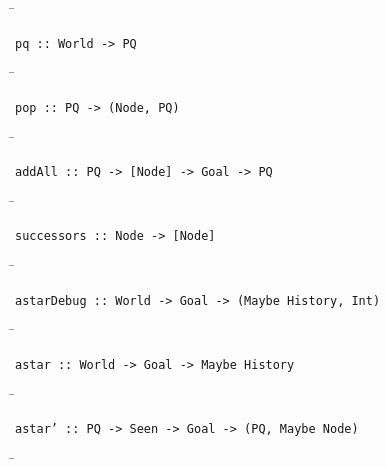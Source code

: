 \begin{tabbing}
\hspace*{1cm}\= \kill
\> 
\end{tabbing}
\begin{verbatim}
pq :: World -> PQ
\end{verbatim}
\begin{tabbing}
\hspace*{1cm}\= \kill
\> 
\end{tabbing}
\begin{verbatim}
pop :: PQ -> (Node, PQ)
\end{verbatim}
\begin{tabbing}
\hspace*{1cm}\= \kill
\> 
\end{tabbing}
\begin{verbatim}
addAll :: PQ -> [Node] -> Goal -> PQ
\end{verbatim}
\begin{tabbing}
\hspace*{1cm}\= \kill
\> 
\end{tabbing}
\begin{verbatim}
successors :: Node -> [Node]
\end{verbatim}
\begin{tabbing}
\hspace*{1cm}\= \kill
\> 
\end{tabbing}
\begin{verbatim}
astarDebug :: World -> Goal -> (Maybe History, Int)
\end{verbatim}
\begin{tabbing}
\hspace*{1cm}\= \kill
\> 
\end{tabbing}
\begin{verbatim}
astar :: World -> Goal -> Maybe History
\end{verbatim}
\begin{tabbing}
\hspace*{1cm}\= \kill
\> 
\end{tabbing}
\begin{verbatim}
astar’ :: PQ -> Seen -> Goal -> (PQ, Maybe Node)
\end{verbatim}
\begin{tabbing}
\hspace*{1cm}\= \kill
\> 
\end{tabbing}
